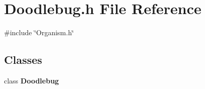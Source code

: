 \section{Doodlebug.\+h File Reference}
\label{Doodlebug_8h}
{\ttfamily \#include \char`\"{}Organism.\+h\char`\"{}}\newline
\subsection*{Classes}
\begin{DoxyCompactItemize}
\item 
class \textbf{ Doodlebug}
\end{DoxyCompactItemize}
